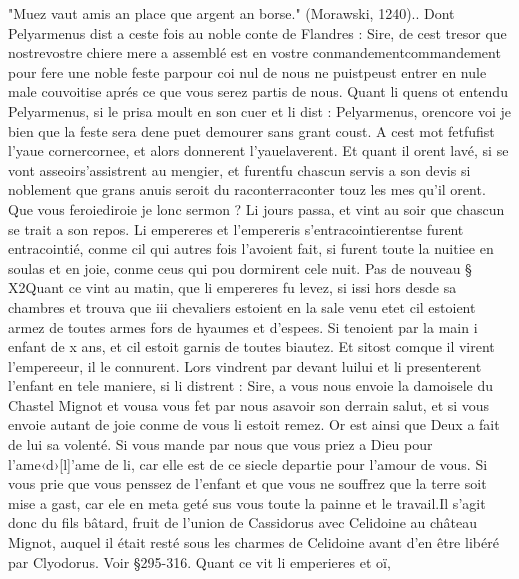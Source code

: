 \documentclass{article}
\begin{document}
\begin{pages}
   "Muez vaut amis an place que argent an borse." (Morawski, 1240).. 
   Dont Pelyarmenus dist a ceste fois 
   au noble conte de Flandres :
   Sire, de cest tresor que 
      nostrevostre chiere mere a assemblé 
      est en vostre conmandementcommandement pour fere une noble 
      feste parpour coi nul de nous ne 
      puistpeust entrer en nule male couvoitise aprés ce que vous serez partis 
      de nous. \pend
\pstart Quant li quens ot entendu 
   Pelyarmenus, si le prisa moult en son cuer et li dist : 
   Pelyarmenus, 
      orencore voi je bien que la feste 
      sera dene puet demourer sans grant coust.
   A cest mot fetfufist l’yaue 
   cornercornee, et 
   alors donnerent l’yauelaverent. 
   Et quant il orent lavé, si 
   se vont asseoirs'assistrent au mengier, 
   et furentfu chascun servis a son devis si noblement que 
      grans anuis seroit du raconterraconter touz les mes qu’il orent. 
   Que vous feroiediroie je 
      lonc sermon ? Li jours passa, et vint au soir que chascun 
   se trait a son repos. 
   Li empereres et l’empereris 
   s’entracointierentse furent entracointié, 
   conme cil qui autres fois l’avoient fait, si furent toute la nuitiee en soulas et en joie, conme ceus qui pou dormirent cele nuit. \pend
\pstart Pas de nouveau § X2Quant ce vint au matin, que li empereres fu levez, 
   si issi hors desde sa chambres et trouva que iii chevaliers estoient 
   en la sale venu etet cil estoient armez de toutes armes fors de hyaumes et 
   d’espees. Si tenoient par la main i enfant de x ans, et 
   cil estoit garnis de toutes biautez.
   Et sitost comque il virent l’empereeur, 
   il le connurent. Lors vindrent par devant 
   luilui et li presenterent l'enfant en tele maniere, si 
   li distrent :
   Sire, a vous nous envoie la damoisele du 
      Chastel Mignot et vousa vous 
      fet par nous asavoir son derrain salut, et si vous envoie autant de joie conme de 
      vous li estoit remez. Or est ainsi que Deux a fait de lui sa volenté. 
      Si vous mande par nous que vous priez a Dieu pour 
         l’ame‹d›[l]’ame de li, 
      car elle est de ce siecle departie pour l’amour de vous. 
      Si vous prie que vous penssez de l’enfant et que vous ne souffrez 
         que la terre soit mise a gast, car ele en meta geté sus vous 
      toute la painne et le travail.Il s'agit donc du fils bâtard, fruit de l'union de Cassidorus 
         avec Celidoine au château Mignot, auquel il était resté sous les charmes de Celidoine avant d'en être libéré par Clyodorus. 
         Voir §295-316. \pend
\pstart Quant ce vit li emperieres 
   et oï, 

\end{pages}
\end{document}
